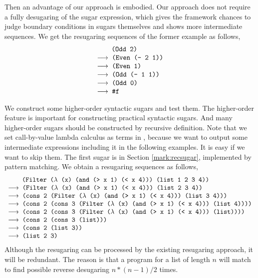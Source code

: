 Then an advantage of our approach is embodied. Our approach does not require a fully desugaring of the sugar expression, which gives the framework chances to judge boundary conditions in sugars themselves and shows more intermediate sequences. We get the resugaring sequences of the former example as follows,
\[
	\begin{array}{l}
		\quad\;\;\Code{ (Odd 2)}\\
		\OneStep{ \Code{ (Even (- 2 1))}}\\
		\OneStep{ \Code{ (Even 1)}}\\
		\OneStep{ \Code{ (Odd (- 1 1))}}\\
		\OneStep{ \Code{ (Odd 0)}}\\
		\OneStep{ \Code{ \#f}}
	\end{array}
\]

We construct some higher-order syntactic sugars and test them. The higher-order feature is important for constructing practical syntactic sugars. And many higher-order sugars should be constructed by recursive definition. Note that we set call-by-value lambda calculus as terms in , because we want to output some intermediate expressions including it in the following examples. It is easy if we want to skip them. The first sugar is  in Section \ref{mark:recsugar}, implemented by pattern matching. We obtain a resugaring sequences as follows,
\[
	\begin{array}{l}
		\quad\;\;\Code{ (Filter ($\lambda$ (x) (and (> x 1) (< x 4))) (list 1 2 3 4))}\\
			\OneStep{ \Code{ (Filter ($\lambda$ (x) (and (> x 1) (< x 4))) (list 2 3 4))}}\\
			\OneStep{ \Code{ (cons 2 (Filter ($\lambda$ (x) (and (> x 1) (< x 4))) (list 3 4)))}}\\
			\OneStep{ \Code{ (cons 2 (cons 3 (Filter ($\lambda$ (x) (and (> x 1) (< x 4))) (list 4))))}}\\
			\OneStep{ \Code{ (cons 2 (cons 3 (Filter ($\lambda$ (x) (and (> x 1) (< x 4))) (list))))}}\\
			\OneStep{ \Code{ (cons 2 (cons 3 (list)))}}\\
			\OneStep{ \Code{ (cons 2 (list 3))}}\\
			\OneStep{ \Code{ (list 2 3)}}
	\end{array}
\]
Although the resugaring can be processed by the existing resugaring approach, it will be redundant. The reason is that a  program for a list of length $n$ will match to find possible reverse desugaring $n*(n-1)/2$ times.

